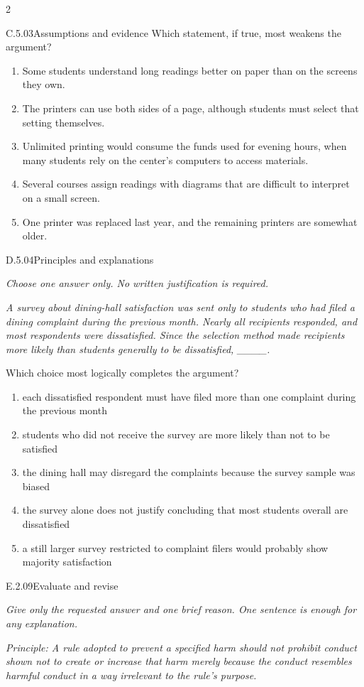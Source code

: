 \documentclass[9pt]{extarticle}
\newcommand{\choice}[1]{\item #1}
\begin{document}
\begin{multicols}{2}
\begin{DenseCoreProblem}{C.5.03}{Assumptions and evidence}
Which statement, if true, most weakens the argument?
\begin{enumerate}[label=(\alph*)]
  \choice{Some students understand long readings better on paper than on the screens they own.}
  \choice{The printers can use both sides of a page, although students must select that setting themselves.}
  \choice{Unlimited printing would consume the funds used for evening hours, when many students rely on the center's computers to access materials.}
  \choice{Several courses assign readings with diagrams that are difficult to interpret on a small screen.}
  \choice{One printer was replaced last year, and the remaining printers are somewhat older.}
\end{enumerate}
\end{DenseCoreProblem}
\begin{DenseCoreProblem}{D.5.04}{Principles and explanations}
{\scriptsize\textit{Choose one answer only. No written justification is required.}\par}
\emph{A survey about dining-hall satisfaction was sent only to students who had filed a dining complaint during the previous month. Nearly all recipients responded, and most respondents were dissatisfied. Since the selection method made recipients more likely than students generally to be dissatisfied, \_\_\_\_.}

Which choice most logically completes the argument?
\begin{enumerate}[label=(\alph*)]
  \choice{each dissatisfied respondent must have filed more than one complaint during the previous month}
  \choice{students who did not receive the survey are more likely than not to be satisfied}
  \choice{the dining hall may disregard the complaints because the survey sample was biased}
  \choice{the survey alone does not justify concluding that most students overall are dissatisfied}
  \choice{a still larger survey restricted to complaint filers would probably show majority satisfaction}
\end{enumerate}
\end{DenseCoreProblem}
\begin{DenseCoreProblem}{E.2.09}{Evaluate and revise}
{\scriptsize\textit{Give only the requested answer and one brief reason. One sentence is enough for any explanation.}\par}
\emph{Principle: A rule adopted to prevent a specified harm should not prohibit conduct shown not to create or increase that harm merely because the conduct resembles harmful conduct in a way irrelevant to the rule's purpose.}


\end{DenseCoreProblem}
\end{multicols}
\end{document}
